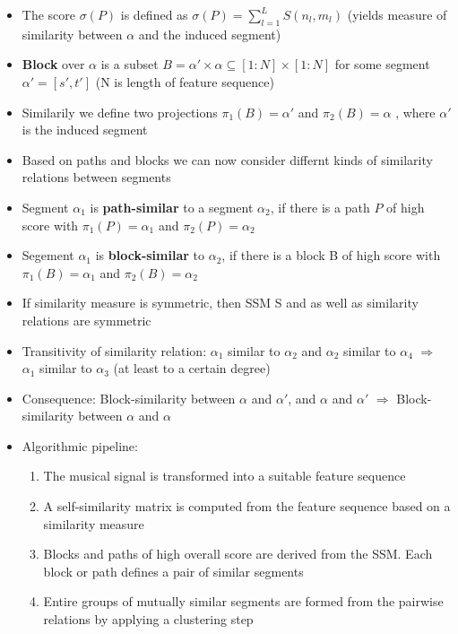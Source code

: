 \documentclass{scrartcl}
\begin{document}
\begin{itemize}
    \item
        The score $\sigma(P)$ is defined as $\sigma(P) = \sum_{l=1}^{L} S(n_l, m_l)$ (yields measure of similarity between $\alpha$ and the induced segment)
    \item
        \textbf{Block} over $\alpha$ is a subset $B = \alpha' \times \alpha \subseteq [1:N] \times [1:N]$ for some segment $\alpha' = [s', t']$ (N is length of feature sequence)
    \item
        Similarily we define two projections $\pi_1(B) = \alpha'$ and $\pi_2(B) = \alpha$ , where $\alpha'$ is the induced segment
    \item
        Based on paths and blocks we can now consider differnt kinds of similarity relations between segments
    \item
        Segment $\alpha_1$ is \textbf{path-similar} to a segment $\alpha_2$, if there is a path $P$ of high score with $\pi_1(P) = \alpha_1$ and $\pi_2(P) = \alpha_2$
    \item
        Segement $\alpha_1$ is \textbf{block-similar} to $\alpha_2$, if there is a block B of high score with $\pi_1(B) = \alpha_1$ and $\pi_2(B) = \alpha_2$
    \item
        If similarity measure is symmetric, then SSM S and as well as similarity relations are symmetric
    \item
        Transitivity of similarity relation: $\alpha_1$ similar to $\alpha_2$ and $\alpha_2$ similar to $\alpha_4$ $\Rightarrow$ $\alpha_1$ similar to $\alpha_3$ (at least to a certain degree)
    \item
        Consequence: Block-similarity between $\alpha$ and $\alpha'$, and $\alpha$ and $\alpha'$ $\Rightarrow$ Block-similarity between $\alpha$ and $\alpha$\\
    \item
        Algorithmic pipeline:
        \begin{enumerate}
            \item
                The musical signal is transformed into a suitable feature sequence
            \item
                A self-similarity matrix is computed from the feature sequence based on a similarity measure
            \item
                Blocks and paths of high overall score are derived from the SSM. Each block or path defines a pair of similar segments
            \item
                Entire groups of mutually similar segments are formed from the pairwise relations by applying a clustering step

\end{enumerate}
\end{itemize}
\end{document}
